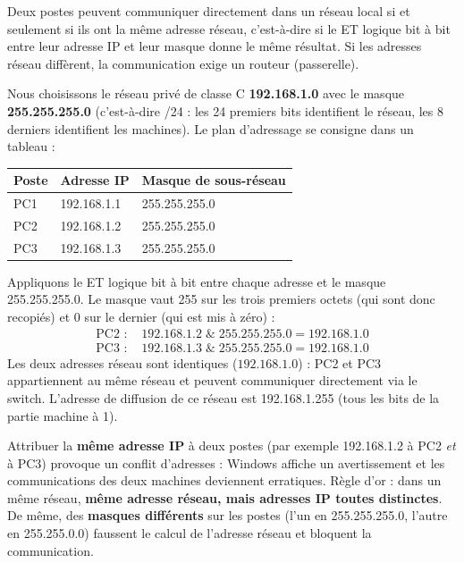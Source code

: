 \documentclass[11pt]{article}
\newcommand{\cle}[1]{{\popxbold\color{popdark}#1}}
\begin{document}
\begin{propriete}
Deux postes peuvent communiquer directement dans un réseau local si et seulement si ils ont la \cle{même adresse réseau}, c'est-à-dire si le ET logique bit à bit entre leur adresse IP et leur masque donne le même résultat. Si les adresses réseau diffèrent, la communication exige un \cle{routeur} (passerelle).
\end{propriete}

Nous choisissons le réseau privé de classe C \textbf{192.168.1.0} avec le masque \textbf{255.255.255.0} (c'est-à-dire /24 : les 24 premiers bits identifient le réseau, les 8 derniers identifient les machines). Le plan d'adressage se consigne dans un tableau :

\begin{center}
\begin{tabularx}{\linewidth}{|l|X|X|}
\hline
\rowcolor{popblueL} \textbf{Poste} & \textbf{Adresse IP} & \textbf{Masque de sous-réseau} \\
\hline
PC1 & 192.168.1.1 & 255.255.255.0 \\
\hline
PC2 & 192.168.1.2 & 255.255.255.0 \\
\hline
PC3 & 192.168.1.3 & 255.255.255.0 \\
\hline
\end{tabularx}
\end{center}

\begin{exemplebox}
Appliquons le ET logique bit à bit entre chaque adresse et le masque 255.255.255.0. Le masque vaut 255 sur les trois premiers octets (qui sont donc recopiés) et 0 sur le dernier (qui est mis à zéro) :
\begin{align*}
\text{PC2 : } & 192.168.1.2 \;\&\; 255.255.255.0 = 192.168.1.0 \\
\text{PC3 : } & 192.168.1.3 \;\&\; 255.255.255.0 = 192.168.1.0
\end{align*}
Les deux adresses réseau sont identiques ($192.168.1.0$) : PC2 et PC3 appartiennent au même réseau et peuvent communiquer directement via le switch. L'adresse de diffusion de ce réseau est 192.168.1.255 (tous les bits de la partie machine à 1).
\end{exemplebox}

\begin{attention}
Attribuer la \textbf{même adresse IP} à deux postes (par exemple 192.168.1.2 à PC2 \emph{et} à PC3) provoque un \cle{conflit d'adresses} : Windows affiche un avertissement et les communications des deux machines deviennent erratiques. Règle d'or : dans un même réseau, \textbf{même adresse réseau, mais adresses IP toutes distinctes}. De même, des \textbf{masques différents} sur les postes (l'un en 255.255.255.0, l'autre en 255.255.0.0) faussent le calcul de l'adresse réseau et bloquent la communication.
\end{attention}
\end{document}
